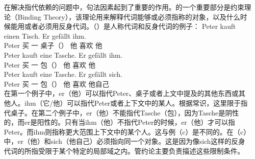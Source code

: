 在解决指代依赖的问题中，句法因素\label{Seite-Bindungstheorie}起到了重要的作用。\gbtc 的一个重要部分是约束理论（Binding Theory），该理论用来解释代词能够或必须指称的对象，以及什么时候能用或者必须用反身代词。（）是人称代词和反身代词的例子：
\eal
\ex 
\gll Peter kauft einen Tisch. Er gefällt ihm.\\
	 Peter 买 一 桌子（\mas{}） 他 喜欢 他\\
\ex 
\gll Peter kauft eine Tasche. Er gefällt ihm.\\
	 Peter 买 一 包（\fem{}） 他 喜欢 他\\
\ex 
\gll Peter kauft eine Tasche. Er gefällt sich.\\
	 Peter 买 一 包（\fem{}） 他 喜欢 他自己\\
\zl
在第一个例子中，er（他）可以指代Peter、桌子或者上文中提及的其他东西或其他人。ihm（它/他）可以指代Peter或者上下文中的某人。根据常识，这里限于指代桌子。在第二个例子中，er（他）不能指代Tasche（包），因为Tasche是阴性的，而er是阳性的。只有当ihm（他）不指代Peter的时候，er（他）才可以指Peter。而ihm则指称更大范围上下文中的某个人。这与例（c）是不同的。在（c）中，er（他）和sich（他自己）必须指向同一个对象。这是因为像sich这样的反身代词的所指受限于某个特定的局部域之内。管约论主要负责描述这些限制条件。

